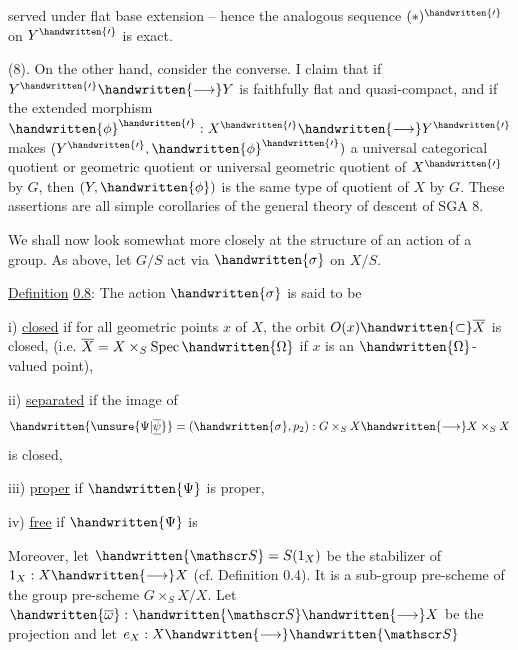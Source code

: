 served under flat base extension -- hence the analogous sequence $(*)^{\handwritten{\prime}}$ on $Y^{\handwritten{\prime}}$ is exact.

(8). On the other hand, consider the converse. I claim that if $Y^{\handwritten{\prime}}\handwritten{\longrightarrow} Y$ is faithfully flat and quasi-compact, and if the extended morphism $\handwritten{\phi}^{\handwritten{\prime}}:X^{\handwritten{\prime}}\handwritten{\longrightarrow} Y^{\handwritten{\prime}}$ makes $(Y^{\handwritten{\prime}},\handwritten{\phi}^{\handwritten{\prime}})$ a universal categorical quotient or geometric quotient or universal geometric quotient of $X^{\handwritten{\prime}}$ by $G$, then $(Y,\handwritten{\phi})$ is the same type of quotient of $X$ by $G$. These assertions are all simple corollaries of the general theory of descent of SGA 8.

 We shall now look somewhat more closely at the structure of an action of a group. As above, let $G/S$ act via $\handwritten{\sigma}$ on $X/S$.

\uline{Definition} \uline{0.8}: The action $\handwritten{\sigma}$ is said to be

i) \uline{closed} if for all geometric points $x$ of $X$, the orbit $O(x)\handwritten{\subset}\overline X$ is closed, (i.e. $\overline X=X\times_S\operatorname{Spec}\handwritten{\Omega}$ if $x$ is an $\handwritten{\Omega}$-valued point),

ii) \uline{separated} if the image of
\[
\handwritten{\unsure{\Psi|\overline{\underline\psi}}}=(\handwritten{\sigma},p_2):G\times_S X\handwritten{\longrightarrow} X\times_S X
\]
is closed,

iii) \uline{proper} if $\handwritten{\Psi}$ is proper,

iv) \uline{free} if $\handwritten{\Psi}$ is 

Moreover, let $\handwritten{\mathscr S}=S(1_X)$ be the stabilizer of $1_X:X\handwritten{\longrightarrow} X$ (cf. Definition 0.4). It is a sub-group pre-scheme of the group pre-scheme $G\times_S X/X$. Let $\handwritten{\overline\omega}:\handwritten{\mathscr S}\handwritten{\longrightarrow} X$ be the projection and let $e_X:X\handwritten{\longrightarrow}\handwritten{\mathscr S}$

